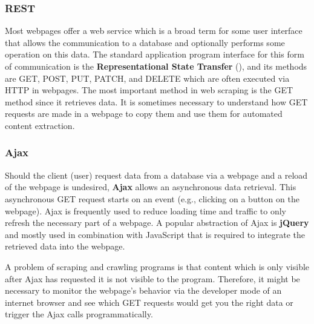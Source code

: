 \subsubsection{REST}

Most webpages offer a web service which is a broad term for some user interface that allows the communication to a database and optionally performs some operation on this data. The standard application program interface for this form of communication is the \textbf{Representational State Transfer} (), and its methods are GET, POST, PUT, PATCH, and DELETE which are often executed via HTTP in webpages. The most important method in web scraping is the GET method since it retrieves data. It is sometimes necessary to understand how GET requests are made in a webpage to copy them and use them for automated content extraction.

\subsubsection{Ajax}

Should the client (user) request data from a database via a webpage and a reload of the webpage is undesired, \textbf{Ajax} allows an asynchronous data retrieval. This asynchronous GET request starts on an event (e.g., clicking on a button on the webpage). Ajax is frequently used to reduce loading time and traffic to only refresh the necessary part of a webpage. A popular abstraction of Ajax is \textbf{jQuery} and mostly used in combination with JavaScript that is required to integrate the retrieved data into the webpage.

A problem of scraping and crawling programs is that content which is only visible after Ajax has requested it is not visible to the program. Therefore, it might be necessary to monitor the webpage's behavior via the developer mode of an internet browser and see which GET requests would get you the right data or trigger the Ajax calls programmatically.
